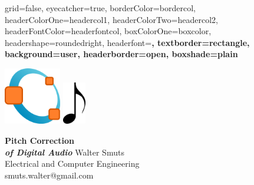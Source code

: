 \documentclass[a1paper,portrait,fontscale=0.43]{baposter}
\begin{document}
\begin{poster}{
	grid=false,
	eyecatcher=true,
	borderColor=bordercol,
	headerColorOne=headercol1,
	headerColorTwo=headercol2,
	headerFontColor=headerfontcol,
	boxColorOne=boxcolor,
	headershape=roundedright,
	headerfont=\Large\sf\bf,
	textborder=rectangle,
	background=user,
	headerborder=open,
  boxshade=plain
}
{
	\begin{minipage}[t][3cm][t]{7.5cm}\centering
	\vfill
	\includegraphics[width=2.5cm]{Octave}\hspace{3cm}
	\includegraphics[width=1cm]{Quaver}\vspace*{3mm}
	\vfill
	\vfill
	\end{minipage}
}
{\sf\bf\HUGE
	Pitch Correction \\ \large\it of Digital Audio
}
{
	{\smaller\smaller 
	\vspace{1em} Walter Smuts\\
	Electrical and Computer Engineering\\
	smuts.walter@gmail.com}
}
{
	\begin{minipage}[t][3cm][t]{7.5cm}\centering

\end{minipage}}
\end{poster}
\end{document}

